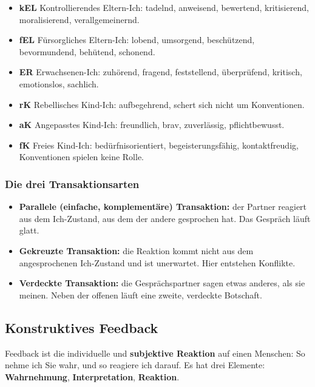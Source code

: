 \documentclass[12pt, a4paper]{article}
\begin{document}
\begin{itemize}
  \item \textbf{kEL} Kontrollierendes Eltern-Ich: tadelnd, anweisend,
        bewertend, kritisierend, moralisierend, verallgemeinernd.
  \item \textbf{fEL} Fürsorgliches Eltern-Ich: lobend, umsorgend,
        beschützend, bevormundend, behütend, schonend.
  \item \textbf{ER} Erwachsenen-Ich: zuhörend, fragend, feststellend,
        überprüfend, kritisch, emotionslos, sachlich.
  \item \textbf{rK} Rebellisches Kind-Ich: aufbegehrend, schert sich nicht um
        Konventionen.
  \item \textbf{aK} Angepasstes Kind-Ich: freundlich, brav, zuverlässig,
        pflichtbewusst.
  \item \textbf{fK} Freies Kind-Ich: bedürfnisorientiert,
        begeisterungsfähig, kontaktfreudig, Konventionen spielen keine
        Rolle.
\end{itemize}

\subsubsection{Die drei Transaktionsarten}

\begin{itemize}
  \item \textbf{Parallele (einfache, komplementäre) Transaktion:} der Partner
        reagiert aus dem Ich-Zustand, aus dem der andere gesprochen hat. Das
        Gespräch läuft glatt.
  \item \textbf{Gekreuzte Transaktion:} die Reaktion kommt nicht aus dem
        angesprochenen Ich-Zustand und ist unerwartet. Hier entstehen
        Konflikte.
  \item \textbf{Verdeckte Transaktion:} die Gesprächspartner sagen etwas
        anderes, als sie meinen. Neben der offenen läuft eine zweite,
        verdeckte Botschaft.
\end{itemize}

\subsection{Konstruktives Feedback}

Feedback ist die individuelle und \textbf{subjektive Reaktion} auf einen
Menschen: \glqq So nehme ich Sie wahr, und so reagiere ich darauf.\grqq{} Es
hat drei Elemente: \textbf{Wahrnehmung}, \textbf{Interpretation},
\textbf{Reaktion}.
\end{document}
